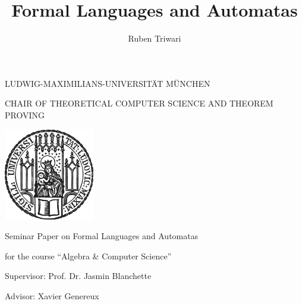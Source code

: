 \documentclass[12pt,letterpaper]{article}
\author{Ruben Triwari}
\begin{document}
\begin{center}\uppercase{Ludwig-Maximilians-Universität München}\end{center}
\begin{center}\uppercase{Chair of Theoretical Computer Science and Theorem Proving}\end{center}

\vspace*{10mm}
\begin{center}
\includegraphics[height=40mm]{sigillum.png}
\end{center}
\vspace*{10mm}

\title{Formal Languages and Automatas}
\date{\vspace{-3ex}}
{\let\newpage\relax\maketitle}
\thispagestyle{empty}

\begin{center}
\begin{large}
\begin{Large}
Seminar Paper on Formal Languages and Automatas\\
\end{Large}
for the course ``Algebra \& Computer Science'' \\
\end{large}
\end{center}
\vspace{1cm}
\begin{center}
\begin{large}
Supervisor: Prof. Dr. Jasmin Blanchette\\
\end{large}
\end{center}
\begin{center}
\begin{large}
Advisor: Xavier Genereux\\
\end{large}
\end{center}
\end{document}
